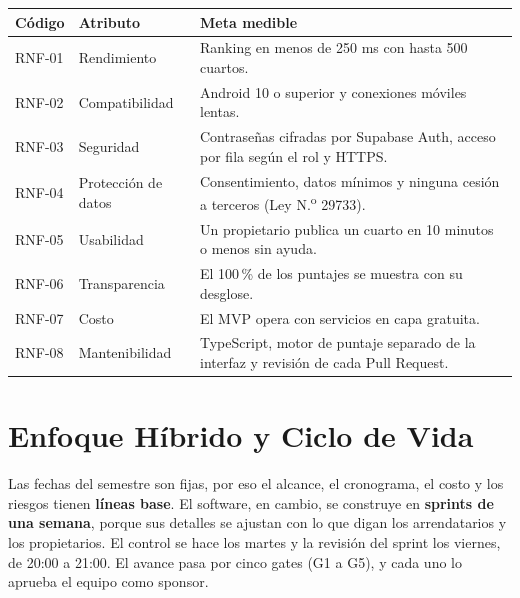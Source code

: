 \documentclass[11pt,a4paper]{article}
\begin{document}
\vspace{0.05cm}
{\small
{}
\noindent\begin{tabularx}{\textwidth}{@{}C{1.3cm} P{2.9cm} L@{}}
\toprule
{}
\textbf{Código} & \textbf{Atributo} & \textbf{Meta medible} \\
\midrule
RNF-01 & Rendimiento & Ranking en menos de 250 ms con hasta 500 cuartos. \\
RNF-02 & Compatibilidad & Android 10 o superior y conexiones móviles lentas. \\
RNF-03 & Seguridad & Contraseñas cifradas por Supabase Auth, acceso por fila según el rol y HTTPS. \\
RNF-04 & Protección de datos & Consentimiento, datos mínimos y ninguna cesión a terceros (Ley N.\textsuperscript{o} 29733). \\
RNF-05 & Usabilidad & Un propietario publica un cuarto en 10 minutos o menos sin ayuda. \\
RNF-06 & Transparencia & El 100\,\% de los puntajes se muestra con su desglose. \\
RNF-07 & Costo & El MVP opera con servicios en capa gratuita. \\
RNF-08 & Mantenibilidad & TypeScript, motor de puntaje separado de la interfaz y revisión de cada Pull Request. \\
\bottomrule
\end{tabularx}
}

\section{Enfoque Híbrido y Ciclo de Vida}
{\small
\noindent Las fechas del semestre son fijas, por eso el alcance, el cronograma, el costo y los riesgos tienen \textbf{líneas base}. El software, en cambio, se construye en \textbf{sprints de una semana}, porque sus detalles se ajustan con lo que digan los arrendatarios y los propietarios. El control se hace los martes y la revisión del sprint los viernes, de 20:00 a 21:00. El avance pasa por cinco gates (G1 a G5), y cada uno lo aprueba el equipo como sponsor.
}
\end{document}
